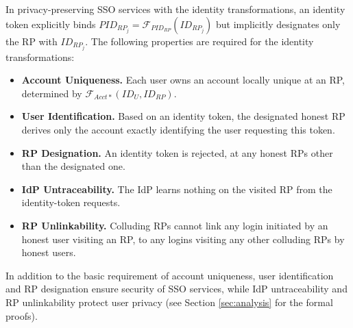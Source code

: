 In privacy-preserving SSO services with the identity transformations,
    an identity token explicitly binds $PID_{RP_j} = \mathcal{F}_{PID_{RP}}(ID_{RP_j})$ but implicitly designates only the RP with $ID_{RP_j}$.
The following properties are required for the identity transformations:
\begin{itemize}
\setlength{\topsep}{0pt}
\setlength{\partopsep}{0pt}
\setlength{\itemsep}{0pt}
\setlength{\parsep}{0pt}
\setlength{\parskip}{0pt}

\item \textbf{Account Uniqueness.} Each user owns an account locally unique at an RP, determined by $\mathcal{F}_{Acct\ast}(ID_{U}, ID_{RP})$.
\item \textbf{User Identification.} Based on an identity token,
    the designated honest RP derives only the account exactly identifying the user requesting this token.
\item \textbf{RP Designation.} 
An identity token is rejected, at any honest RPs other than the designated one.

\item \textbf{IdP Untraceability.}
The IdP learns nothing on the visited RP from the identity-token requests.

\item \textbf{RP Unlinkability.}
Colluding RPs 
 cannot link any login initiated by an honest user visiting an RP,
  to any logins visiting any other colluding RPs by honest users.
\end{itemize}

In addition to the basic requirement of account uniqueness,
    user identification and RP designation ensure security of SSO services,
    while IdP untraceability and RP unlinkability protect user privacy
(see Section \ref{sec:analysis} for the formal proofs). 